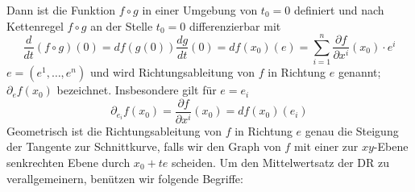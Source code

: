 Dann ist die Funktion $f\circ g$ in einer Umgebung von $t_0=0$ definiert und nach Kettenregel $f\circ g$ an der Stelle $t_0=0$ differenzierbar mit
\[\frac{d}{{dt}}\left( {f \circ g} \right)\left( 0 \right) = df\left( {g\left( 0 \right)} \right)\frac{{dg}}{{dt}}\left( 0 \right) = df\left( {{x_0}} \right)\left( e \right) = \sum\limits_{i = 1}^n {\frac{{\partial f}}{{\partial {x^i}}}\left( {{x_0}} \right) \cdot {e^i}} \]
$e=\left( e^1,\dots, e^n\right) $ und wird Richtungsableitung von $f$ in Richtung $e$ genannt; $\partial_ef\left( x_0\right)$ bezeichnet. Insbesondere gilt für $e=e_i$
\[{\partial _{{e_i}}}f\left( {{x_0}} \right) = \frac{{\partial f}}{{\partial {x^i}}}\left( {{x_0}} \right) = df\left( {{x_0}} \right)\left( {{e_i}} \right)\]
Geometrisch ist die Richtungsableitung von $f$ in Richtung $e$ genau die Steigung der Tangente zur Schnittkurve, falls wir den Graph von $f$ mit einer zur $xy$-Ebene senkrechten Ebene durch $x_0+te$ scheiden.
%
Um den Mittelwertsatz der DR zu verallgemeinern, benützen wir folgende Begriffe:
